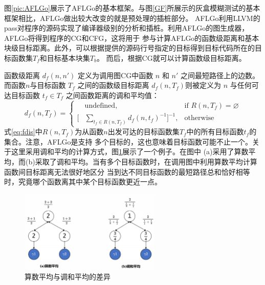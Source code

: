 \documentclass[bachelor]{njupthesis}
\begin{document}
图\ref{pic:AFLGo}展示了AFLGo的基本框架。与图\ref{GF}所展示的灰盒模糊测试的基本框架相比，AFLGo做出较大改变的就是预处理的插桩部分。
AFLGo利用LLVM的pass\cite{Pass}对程序的源码实现了编译器级别的分析和插桩。利用AFLGo的图生成器，AFLGo将得到程序的CG和CFG，这将用于
参与计算AFLGo的函数级距离和基本块级目标距离。此外，可以根据提供的源码行号指定的目标得到目标代码所在的目标函数集$T_f$和目标基本块集$T_b$。
而后，根据CG就可以计算函数级目标距离。

函数级距离 $d_f(n, n')$ 定义为调用图CG中函数 $n$ 和 $n'$ 之间最短路径上的边数。而函数$n$与目标函数 $T_f$ 
之间的函数级目标距离 $d_f (n,T_f) $则被定义为 $n$ 与任何可达目标函数 $t_f \in T_f$ 之间函数距离的调和平均值：
 \begin{equation}\label{eq:fdis}
	d_f(n,T_f)=\left\{ \begin{aligned}
		&\text{undefined} , &\text{if } R(n,T_f)=\varnothing \\
	   [&\sum\limits_{t_f\in R(n,T_f)} d_f(n,t_f)^{-1}]^{-1} , &\text{otherwise} 
   \end{aligned}
   \right.
 \end{equation}
式\ref{eq:fdis}中$R(n,T_f)$为从函数$n$出发可达的目标函数集$T_f$中的所有目标函数$t_f$的集合。注意，AFLGo是支持
多个目标的，这也意味着目标函数可能不止一个。关于这里采用调和平均的计算方式，图\ref{pic:diff}展示了一个例子。在图中
(a)采用了算数平均，而(b)采取了调和平均。当有多个目标函数时，在调用图中利用算数平均计算函数间目标距离无法很好地区分
当到达不同目标函数的最短路径总和恰好相等时，究竟哪个函数离其中某个目标函数更近一点。

\begin{figure}[htbp]
	\centering
	\includegraphics[width=0.6\textwidth]{pic/diff.pdf}
	\caption{算数平均与调和平均的差异}
 	\label{pic:diff}
\end{figure}
\end{document}
